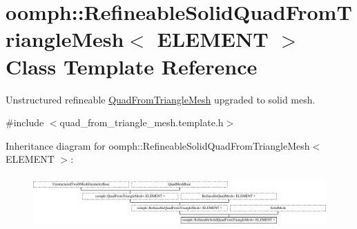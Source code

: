 \hypertarget{classoomph_1_1RefineableSolidQuadFromTriangleMesh}{}\section{oomph\+:\+:Refineable\+Solid\+Quad\+From\+Triangle\+Mesh$<$ E\+L\+E\+M\+E\+NT $>$ Class Template Reference}
\label{classoomph_1_1RefineableSolidQuadFromTriangleMesh}


Unstructured refineable \hyperlink{classoomph_1_1QuadFromTriangleMesh}{Quad\+From\+Triangle\+Mesh} upgraded to solid mesh.  




{\ttfamily \#include $<$quad\+\_\+from\+\_\+triangle\+\_\+mesh.\+template.\+h$>$}

Inheritance diagram for oomph\+:\+:Refineable\+Solid\+Quad\+From\+Triangle\+Mesh$<$ E\+L\+E\+M\+E\+NT $>$\+:\begin{figure}[H]
\begin{center}
\leavevmode
\includegraphics[height=2.018018cm]{classoomph_1_1RefineableSolidQuadFromTriangleMesh}
\end{center}
\end{figure}
